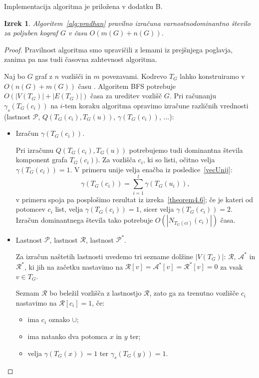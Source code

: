 \documentclass[12pt,a4paper,twoside]{article}
\theoremstyle{definition} %
\theoremstyle{plain} %
\newtheorem{izrek}[definicija]{Izrek}
\numberwithin{equation}{section}  %
\begin{document}
Implementacija algoritma je priložena v dodatku B.
\begin{izrek} Algoritem~\ref{alg:pradhan} pravilno izračuna varnostnodominantno število za poljuben kograf $G$ v času $O(m(G) + n(G))$.
\end{izrek}
\begin{proof}
Pravilnost algoritma smo upravičili z lemami iz prejšnjega poglavja, zanima pa nas tudi časovna zahtevnost algoritma.

Naj bo $G$ graf z $n$ vozlišči in $m$ povezavami. Kodrevo $T_G$ lahko konstruiramo v $O(n(G)+m(G))$ času \cite{corneil1985linear}. Algoritem BFS potrebuje $O(|V(T_G)| + |E(T_G)|)$ časa za ureditev vozlišč $G$. Pri računanju $\gamma_s(T_G(c_i))$ na $i$-tem koraku algoritma opravimo izračune različnih vrednosti (lastnost $\mathcal{P}$, $Q(T_G(c_i), T_G(u))$, $\gamma(T_G(c_i))$, ...):
\begin{itemize}
\item Izračun $\gamma(T_G(c_i))$.

Pri izračunu $Q(T_G(c_i), T_G(u))$ potrebujemo tudi dominantna števila komponent grafa $T_G(c_i))$. Za vozlišča $c_i$, ki so listi, očitno velja $\gamma(T_G(c_i)) = 1$. V primeru unije velja enačba iz  posledice~\ref{vecUnij}: $$\gamma(T_G(c_i)) = \sum\limits_{i=1}^l \gamma(T_G(u_i)),$$v primeru spoja pa posplošimo rezultat iz izreka~\ref{theorem4.6}; če je kateri od potomcev $c_i$ list, velja $\gamma(T_G(c_i)) = 1$, sicer velja $\gamma(T_G(c_i)) = 2$. Izračun dominantnega števila tako potrebuje $O(|N_{T_G(ci)}(c_i)|)$ časa.

\item Lastnost $\mathcal{P}$, lastnost $\mathcal{R}$, lastnost $\mathcal{P^*}$.

Za izračun naštetih lastnosti uvedemo tri sezname dolžine $|V(T_G)|$: $\mathcal{R}$, $\mathcal{A^*}$ in $\mathcal{R^*}$, ki jih na začetku nastavimo na $\mathcal{R}[v]=\mathcal{A^*}[v]=\mathcal{R^*}[v]=0$ za vsak $v\in T_G$.

Seznam $\mathcal{R}$ bo beležil vozlišča z lastnostjo $\mathcal{R}$, zato ga za trenutno vozlišče $c_i$ nastavimo na $\mathcal{R}[{c_i}]=1$, če:
\begin{itemize}
    \item ima $c_i$ oznako $\cup$;
    \item ima natanko dva potomca $x$ in $y$ ter;
    \item velja $\gamma(T_G(x)) = 1$ ter $\gamma_s(T_G(y)) = 1$.
\end{itemize}


\end{itemize}
\end{proof}
\end{document}
